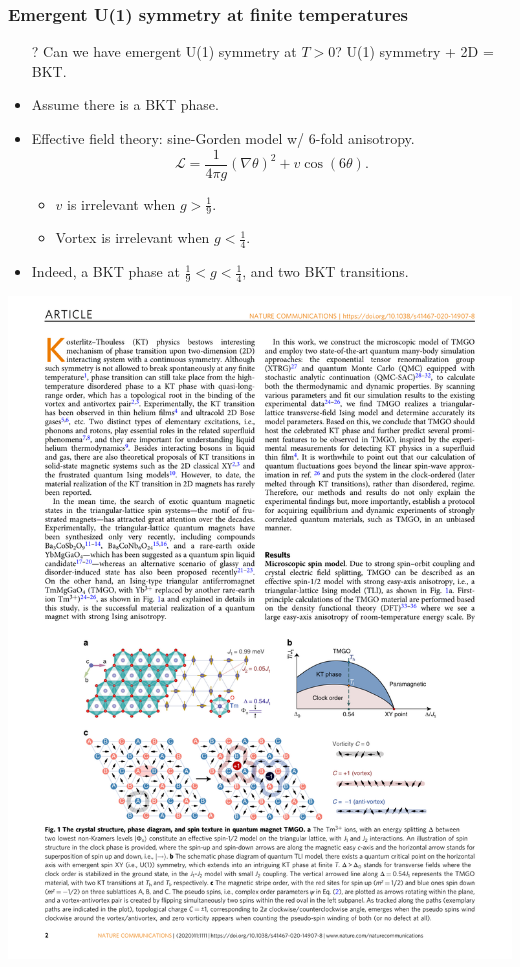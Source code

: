\documentclass[xcolor=table, aspectratio=1610,ignorenonframetext]{beamer}
\begin{document}
\begin{frame}
  \frametitle{Emergent U(1) symmetry at finite temperatures}
  \begin{itemize}
    \item[?] Can we have emergent U(1) symmetry at $T>0$? U(1) symmetry + 2D = BKT.
    \item \alert{Assume} there is a BKT phase.
    \item Effective field theory: sine-Gorden model w/ 6-fold anisotropy.
    \[\mathcal L = \frac1{4\pi g}(\nabla\theta)^2 + v\cos(6\theta).\]
    \begin{itemize}
      \item $v$ is irrelevant when $g>\frac19$.
      \item Vortex is irrelevant when $g < \frac14$.
    \end{itemize}
    \item Indeed, a BKT phase at $\frac19<g<\frac14$, and two BKT transitions.
  \end{itemize}
  \begin{center}
    \includegraphics{phase-diagram}
  \end{center}
\end{frame}
\end{document}
